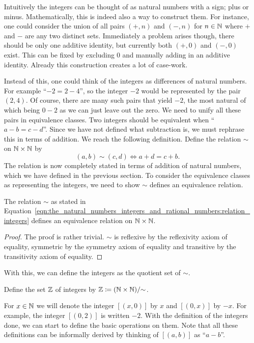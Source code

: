 \documentclass[../main.tex]{subfiles}
\begin{document}
Intuitively the integers can be thought of as natural numbers with a sign; plus or minus. Mathematically, this is indeed also a way to construct them. For instance, one could consider the union of all pairs $(+,n)$ and $(-,n)$ for $n\in\mathbb{N}$ where $+$ and $-$ are any two distinct sets. Immediately a problem arises though, there should be only one additive identity, but currently both $(+,0)$ and $(-,0)$ exist. This can be fixed by excluding $0$ and manually adding in an additive identity. Already this construction creates a lot of case-work.

Instead of this, one could think of the integers as differences of natural numbers. For example ``$-2=2-4$'', so the integer $-2$ would be represented by the pair $(2,4)$. Of course, there are many such pairs that yield $-2$, the most natural of which being $0-2$ as we can just leave out the zero. We need to unify all these pairs in equivalence classes. Two integers should be equivalent when ``$a-b=c-d$''. Since we have not defined what subtraction is, we must rephrase this in terms of addition. We reach the following definition. Define the relation $\sim$ on $\mathbb{N}\times\mathbb{N}$ by
\begin{equation}\label{eqn:the_natural_numbers_integers_and_rational_numbers:relation_integers}
    (a,b)\sim(c,d)\iff a+d=c+b.
\end{equation}
The relation is now completely stated in terms of addition of natural numbers, which we have defined in the previous section. To consider the equivalence classes as representing the integers, we need to show $\sim$ defines an equivalence relation.
\begin{lemma}
    The relation $\sim$ as stated in Equation~\eqref{eqn:the_natural_numbers_integers_and_rational_numbers:relation_integers} defines an equivalence relation on $\mathbb{N}\times\mathbb{N}$.
\end{lemma}
\begin{proof}
    The proof is rather trivial. $\sim$ is reflexive by the reflexivity axiom of equality, symmetric by the symmetry axiom of equality and transitive by the transitivity axiom of equality.
\end{proof}
With this, we can define the integers as the quotient set of $\sim$.
\begin{definition}[Integers]
    Define the set $\mathbb{Z}$ of integers by $\mathbb{Z}\coloneq(\mathbb{N}\times\mathbb{N})/{\sim}$.
\end{definition}
For $x\in\mathbb{N}$ we will denote the integer $[(x,0)]$ by $x$ and $[(0,x)]$ by $-x$. For example, the integer $[(0,2)]$ is written $-2$. With the definition of the integers done, we can start to define the basic operations on them. Note that all these definitions can be informally derived by thinking of $[(a,b)]$ as ``$a-b$''.
\end{document}
